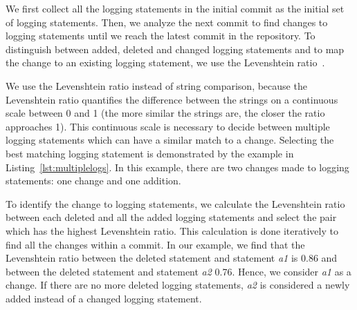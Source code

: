 We first collect all the logging statements in the initial commit as the initial set of logging statements. Then, we analyze the next commit to find changes to logging statements until we reach the latest commit in the repository. To distinguish between added, deleted and changed logging statements and to map the change to an existing logging statement, we use the Levenshtein ratio~\cite{levenshteinratio}. 

We use the Levenshtein ratio instead of string comparison, because the Levenshtein ratio quantifies the difference between the strings on a continuous scale between 0 and 1 (the more similar the strings are, the closer the ratio approaches 1). This continuous scale is necessary to decide between multiple logging statements which can have a similar match to a change. Selecting the best matching logging statement is demonstrated by the example in Listing~\ref{lst:multiplelogs}. In this example, there are two changes made to logging statements: one change and one addition. 








To identify the change to logging statements, we calculate the Levenshtein ratio between each deleted and all the added logging statements and select the pair which has the highest Levenshtein ratio. This calculation is done iteratively to find all the changes within a commit. In our example, we find that the Levenshtein ratio between the deleted statement and statement \emph{a1} is 0.86 and between the deleted statement and statement \emph{a2} 0.76. Hence, we consider \emph{a1} as a change. If there are no more deleted logging statements, \emph{a2} is considered a newly added instead of a changed logging statement. 

